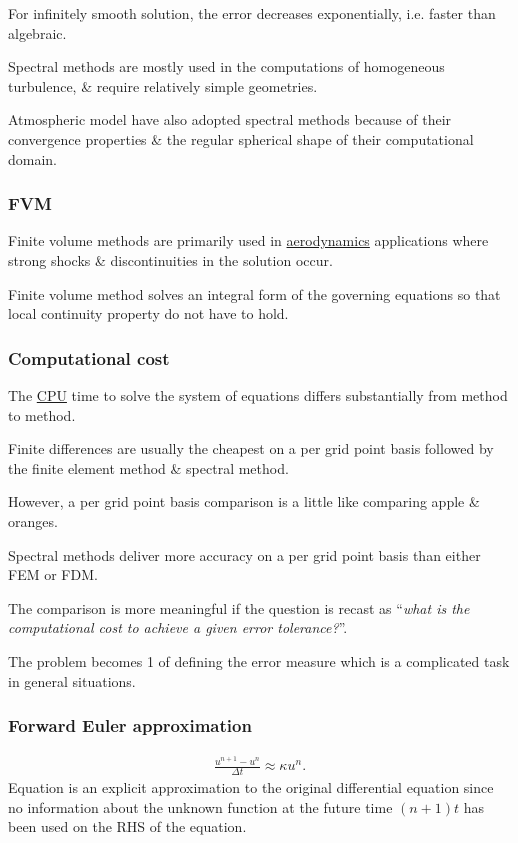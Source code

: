 \documentclass{article}
\begin{document}
For infinitely smooth solution, the error decreases exponentially, i.e. faster than algebraic.

Spectral methods are mostly used in the computations of homogeneous turbulence, \& require relatively simple geometries.

Atmospheric model have also adopted spectral methods because of their convergence properties \& the regular spherical shape of their computational domain.

\subsubsection{FVM}
Finite volume methods are primarily used in \href{https://en.wikipedia.org/wiki/Aerodynamics}{aerodynamics} applications where strong shocks \& discontinuities in the solution occur.

Finite volume method solves an integral form of the governing equations so that local continuity property do not have to hold.

\subsubsection{Computational cost}
The \href{https://en.wikipedia.org/wiki/CPU}{CPU} time to solve the system of equations differs substantially from method to method.

Finite differences are usually the cheapest on a per grid point basis followed by the finite element method \& spectral method.

However, a per grid point basis comparison is a little like comparing apple \& oranges.

Spectral methods deliver more accuracy on a per grid point basis than either FEM or FDM.

The comparison is more meaningful if the question is recast as ``\textit{what is the computational cost to achieve a given error tolerance?}''.

The problem becomes 1 of defining the error measure which is a complicated task in general situations.

\subsubsection{Forward Euler approximation}
\begin{align*}
	\frac{u^{n + 1} - u^n}{\Delta t}\approx\kappa u^n.
\end{align*}
Equation is an explicit approximation to the original differential equation since no information about the unknown function at the future time $(n + 1)t$ has been used on the RHS of the equation.
\end{document}
